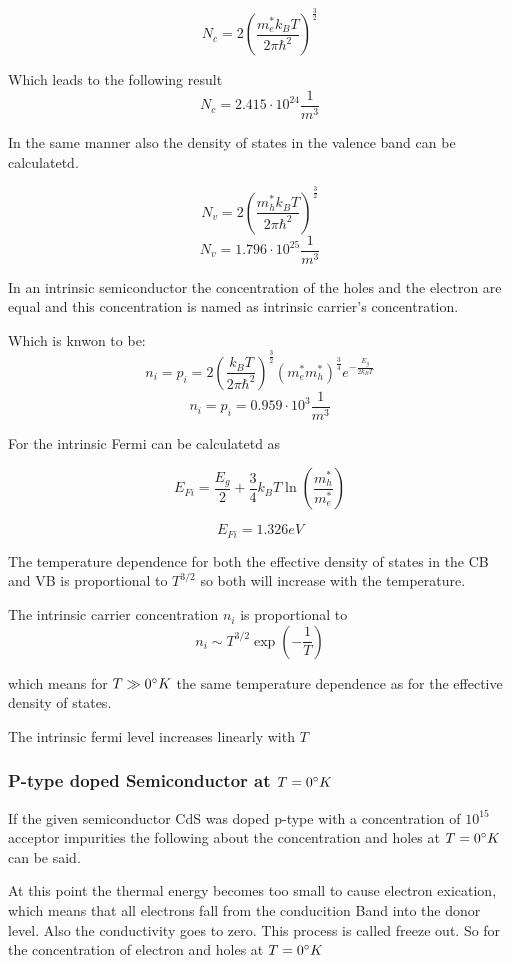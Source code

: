 $$ N_c = 2 \left( \frac{m_e^*k_BT}{2\pi\hbar^2}\right)^{\frac{3}{2}}$$

Which leads to the following result
$$ N_c = 2.415 \cdot 10^{24} \frac{1}{m^3}$$

In the same manner also the density of states in the valence band can be
calculatetd.

$$ N_v = 2 \left( \frac{m_h^*k_BT}{2\pi\hbar^2}\right)^{\frac{3}{2}}$$
$$ N_v = 1.796 \cdot 10^{25} \frac{1}{m^3}$$

In an intrinsic semiconductor the concentration of the holes and the 
electron are equal and this concentration is named as
intrinsic carrier's concentration. 

Which is knwon to be:
$$n_i = p_i = 2 \left( \frac{k_BT}{2\pi\hbar^2} \right)^{\frac{3}{2}}
  (m_e^*m_h^*)^{\frac{3}{4}} e^{-\frac{E_g}{2k_BT}}$$
$$n_i = p_i = 0.959 \cdot 10^3 \frac{1}{m^3}$$

For the intrinsic Fermi can be calculatetd as 

$$E_{Fi} = \frac{E_g}{2} + \frac{3}{4} k_B T \ln\left( \frac{m_h^*}{m_e^*} \right)$$

$$E_{Fi} = 1.326 eV$$

The temperature dependence for both the effective density
of states in the CB and VB is proportional to $T^{3/2}$ so
both will increase with the temperature.

The intrinsic carrier concentration $n_i$ is proportional to
$$n_i \sim T^{3/2} \exp(-\frac{1}{T})$$

which means for $T \gg 0 \degree K$ the same temperature dependence as for the effective density of states.

The intrinsic fermi level increases linearly with $T$


\subsubsection*{P-type doped Semiconductor at $T=0\degree K$}

If the given semiconductor CdS was doped p-type with a
concentration of $10^{15}$ acceptor impurities the following
about the concentration and holes at $T=0\degree K$ can be said.

At this point the thermal energy becomes too small to cause electron exication, which means that all electrons fall from
the conducition Band into the donor level. Also the conductivity
goes to zero. This process is called freeze out. 
So for the concentration of electron and holes at $T=0 \degree K$

